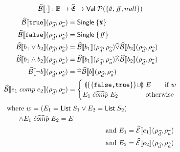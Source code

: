 \begin{align}
    \absboolsem{\cdot} &: \mathbb{B} \rightarrow \ab{\mathfrak{E}} \rightarrow \mathsf{Val} \; \mathcal{P}(\{\true, \false, null\}) \label{eq:bool-operation}
\end{align}
\begin{align}
    \absboolsem{\texttt{true}}(\rho_{\ab{d}}, \rho_{\ab{a}}) &= \mathsf{Single} \; \{\true\} \label{eq:abstract-bool-semantics-start} \\
    \absboolsem{\texttt{false}}(\rho_{\ab{d}}, \rho_{\ab{a}}) &= \mathsf{Single} \; \{\false\} \\
    \absboolsem{b_1 \lor b_2}(\rho_{\ab{d}}, \rho_{\ab{a}}) &= \absboolsem{b_1}(\rho_{\ab{d}}, \rho_{\ab{a}}) \ab{\lor} \absboolsem{b_2}(\rho_{\ab{d}}, \rho_{\ab{a}}) \\
    \absboolsem{b_1 \land b_2}(\rho_{\ab{d}}, \rho_{\ab{a}}) &= \absboolsem{b_1}(\rho_{\ab{d}}, \rho_{\ab{a}}) \ab{\land} \absboolsem{b_2}(\rho_{\ab{d}}, \rho_{\ab{a}}) \\
    \absboolsem{\neg b}(\rho_{\ab{d}}, \rho_{\ab{a}}) &= \ab{\neg} \absboolsem{b}(\rho_{\ab{d}}, \rho_{\ab{a}})  \\
    \absboolsem{e_1 \;comp\; e_2}(\rho_{\ab{d}}, \rho_{\ab{a}}) &=  \begin{cases}
        \app{\{\{\texttt{false,true}\}\} \cup} E \quad \quad \text{if } w\\
        E_1 \;\ab{\comp}\; E_2 \quad \quad \quad \quad \text{otherwise}
    \end{cases}\label{eq:abstract-bool-semantics-end}
\end{align}
\begin{align}
    \begin{split}
        \text{where } w&=(E_1 = \mathsf{List} \; S_1 \lor E_2 = \mathsf{List} \; S_2) \\
        \land E_1 &\;\widehat{comp}\; E_2 = E \nonumber
    \end{split} \\
    \text{and } E_1 &= \widehat{\mathcal{E}}\llbracket e_1 \rrbracket(\rho_{\widehat{d}}, \rho_{\widehat{a}}) \nonumber \\
    \text{and }  E_2 &= \widehat{\mathcal{E}}\llbracket e_2 \rrbracket(\rho_{\widehat{d}}, \rho_{\widehat{a}})  \nonumber
\end{align}

